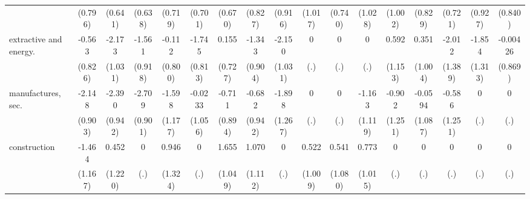 {\begin{tabular}{l*{16}{c}}
                    &     (0.796)         &     (0.641)         &     (0.638)         &     (0.719)         &     (0.701)         &     (0.670)         &     (0.827)         &     (0.916)         &     (1.017)         &     (0.740)         &     (1.028)         &     (1.002)         &     (0.829)         &     (0.721)         &     (0.927)         &     (0.840)         \\
[1em]
extractive and energy.&      -0.563         &      -2.173\sym{*}  &      -1.561         &      -0.112         &      -1.745\sym{*}  &       0.155         &      -1.343         &      -2.150\sym{*}  &           0         &           0         &           0         &       0.592         &       0.351         &      -2.012         &      -1.854         &    -0.00426         \\
                    &     (0.826)         &     (1.031)         &     (0.918)         &     (0.800)         &     (0.813)         &     (0.727)         &     (0.904)         &     (1.031)         &         (.)         &         (.)         &         (.)         &     (1.153)         &     (1.004)         &     (1.389)         &     (1.313)         &     (0.869)         \\
[1em]
manufactures, sec.  &      -2.148\sym{*}  &      -2.390\sym{*}  &      -2.709\sym{**} &      -1.598         &     -0.0233         &      -0.711         &      -0.682         &      -1.898         &           0         &           0         &      -1.163         &      -0.902         &     -0.0594         &      -0.586         &           0         &           0         \\
                    &     (0.903)         &     (0.942)         &     (0.901)         &     (1.177)         &     (1.056)         &     (0.894)         &     (0.942)         &     (1.267)         &         (.)         &         (.)         &     (1.119)         &     (1.251)         &     (1.087)         &     (1.251)         &         (.)         &         (.)         \\
[1em]
construction        &      -1.464         &       0.452         &           0         &       0.946         &           0         &       1.655         &       1.070         &           0         &       0.522         &       0.541         &       0.773         &           0         &           0         &           0         &           0         &           0         \\
                    &     (1.167)         &     (1.220)         &         (.)         &     (1.324)         &         (.)         &     (1.049)         &     (1.112)         &         (.)         &     (1.009)         &     (1.080)         &     (1.015)         &         (.)         &         (.)         &         (.)         &         (.)         &         (.)         \\

\end{tabular}}
